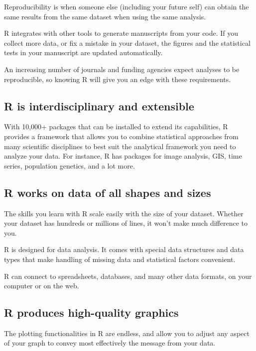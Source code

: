 \documentclass[]{book}
\begin{document}
Reproducibility is when someone else (including your future self) can
obtain the same results from the same dataset when using the same
analysis.

R integrates with other tools to generate manuscripts from your code. If
you collect more data, or fix a mistake in your dataset, the figures and
the statistical tests in your manuscript are updated automatically.

An increasing number of journals and funding agencies expect analyses to
be reproducible, so knowing R will give you an edge with these
requirements.

\subsection{R is interdisciplinary and
extensible}\label{r-is-interdisciplinary-and-extensible}

With 10,000+ packages that can be installed to extend its capabilities,
R provides a framework that allows you to combine statistical approaches
from many scientific disciplines to best suit the analytical framework
you need to analyze your data. For instance, R has packages for image
analysis, GIS, time series, population genetics, and a lot more.

\subsection{R works on data of all shapes and
sizes}\label{r-works-on-data-of-all-shapes-and-sizes}

The skills you learn with R scale easily with the size of your dataset.
Whether your dataset has hundreds or millions of lines, it won't make
much difference to you.

R is designed for data analysis. It comes with special data structures
and data types that make handling of missing data and statistical
factors convenient.

R can connect to spreadsheets, databases, and many other data formats,
on your computer or on the web.

\subsection{R produces high-quality
graphics}\label{r-produces-high-quality-graphics}

The plotting functionalities in R are endless, and allow you to adjust
any aspect of your graph to convey most effectively the message from
your data.
\end{document}
